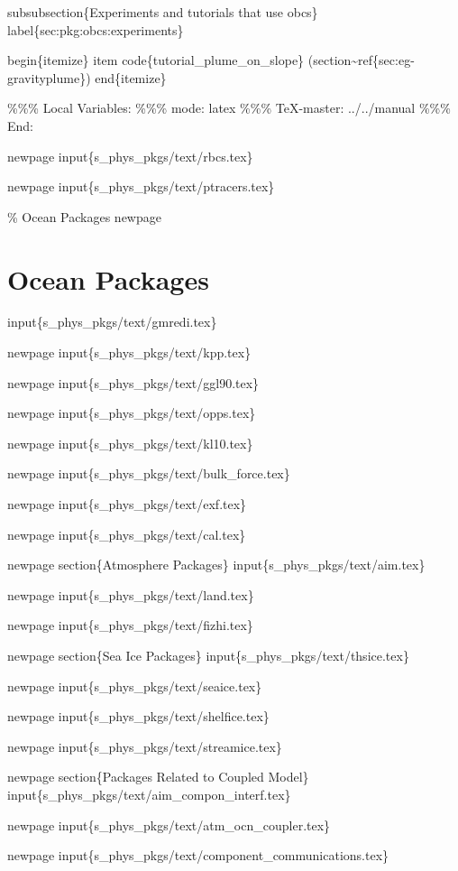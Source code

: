 \documentclass[letterpaper,10pt,english]{sphinxmanual}
\begin{document}
subsubsection\{Experiments and tutorials that use obcs\}
label\{sec:pkg:obcs:experiments\}

begin\{itemize\}
item code\{tutorial\_plume\_on\_slope\} (section\textasciitilde{}ref\{sec:eg-gravityplume\})
end\{itemize\}

\%\%\% Local Variables:
\%\%\% mode: latex
\%\%\% TeX-master: \sphinxquotedblright{}../../manual\sphinxquotedblright{}
\%\%\% End:

newpage
input\{s\_phys\_pkgs/text/rbcs.tex\}

newpage
input\{s\_phys\_pkgs/text/ptracers.tex\}

\% Ocean Packages
newpage


\section{Ocean Packages}
\label{\detokenize{phys_pkgs/phys_pkgs:ocean-packages}}
input\{s\_phys\_pkgs/text/gmredi.tex\}

newpage
input\{s\_phys\_pkgs/text/kpp.tex\}

newpage
input\{s\_phys\_pkgs/text/ggl90.tex\}

newpage
input\{s\_phys\_pkgs/text/opps.tex\}

newpage
input\{s\_phys\_pkgs/text/kl10.tex\}

newpage
input\{s\_phys\_pkgs/text/bulk\_force.tex\}

newpage
input\{s\_phys\_pkgs/text/exf.tex\}

newpage
input\{s\_phys\_pkgs/text/cal.tex\}

newpage
section\{Atmosphere Packages\}
input\{s\_phys\_pkgs/text/aim.tex\}

newpage
input\{s\_phys\_pkgs/text/land.tex\}

newpage
input\{s\_phys\_pkgs/text/fizhi.tex\}

newpage
section\{Sea Ice Packages\}
input\{s\_phys\_pkgs/text/thsice.tex\}

newpage
input\{s\_phys\_pkgs/text/seaice.tex\}

newpage
input\{s\_phys\_pkgs/text/shelfice.tex\}

newpage
input\{s\_phys\_pkgs/text/streamice.tex\}

newpage
section\{Packages Related to Coupled Model\}
input\{s\_phys\_pkgs/text/aim\_compon\_interf.tex\}

newpage
input\{s\_phys\_pkgs/text/atm\_ocn\_coupler.tex\}

newpage
input\{s\_phys\_pkgs/text/component\_communications.tex\}
\end{document}

